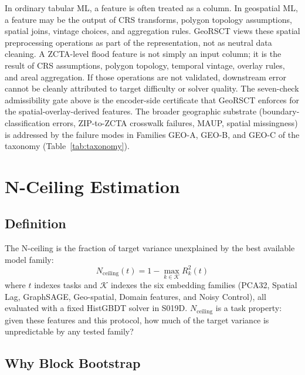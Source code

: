 \documentclass{article}
\begin{document}
In ordinary tabular ML, a feature is often treated as a column. In geospatial ML, a feature may be the output of CRS transforms, polygon topology assumptions, spatial joins, vintage choices, and aggregation rules. GeoRSCT views these spatial preprocessing operations as part of the representation, not as neutral data cleaning. A ZCTA-level flood feature is not simply an input column; it is the result of CRS assumptions, polygon topology, temporal vintage, overlay rules, and areal aggregation. If those operations are not validated, downstream error cannot be cleanly attributed to target difficulty or solver quality. The seven-check admissibility gate above is the encoder-side certificate that GeoRSCT enforces for the spatial-overlay-derived features. The broader geographic substrate (boundary-classification errors, ZIP-to-ZCTA crosswalk failures, MAUP, spatial missingness) is addressed by the failure modes in Families GEO-A, GEO-B, and GEO-C of the taxonomy (Table~\ref{tab:taxonomy}).


\section{N-Ceiling Estimation}
\label{app:nceiling_method}

\subsection{Definition}

The N-ceiling is the fraction of target variance unexplained by the best available model family:
\begin{equation}
N_{\text{ceiling}}(t) = 1 - \max_{k \in \mathcal{K}} R^2_k(t)
\end{equation}
where $t$ indexes tasks and $\mathcal{K}$ indexes the six embedding families (PCA32, Spatial Lag, GraphSAGE, Geo-spatial, Domain features, and Noisy Control), all evaluated with a fixed HistGBDT solver in S019D. $N_{\text{ceiling}}$ is a task property: given these features and this protocol, how much of the target variance is unpredictable by any tested family?

\subsection{Why Block Bootstrap}
\end{document}
